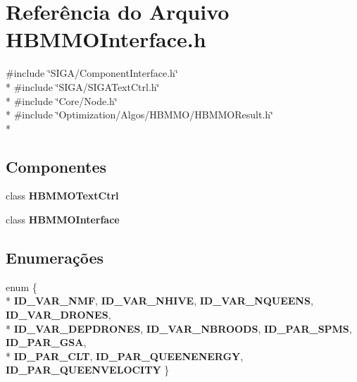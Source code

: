 \section{Referência do Arquivo H\+B\+M\+M\+O\+Interface.\+h}
\label{_h_b_m_m_o_interface_8h}
{\ttfamily \#include \char`\"{}S\+I\+G\+A/\+Component\+Interface.\+h\char`\"{}}\\*
{\ttfamily \#include \char`\"{}S\+I\+G\+A/\+S\+I\+G\+A\+Text\+Ctrl.\+h\char`\"{}}\\*
{\ttfamily \#include \char`\"{}Core/\+Node.\+h\char`\"{}}\\*
{\ttfamily \#include \char`\"{}Optimization/\+Algos/\+H\+B\+M\+M\+O/\+H\+B\+M\+M\+O\+Result.\+h\char`\"{}}\\*
\subsection*{Componentes}
\begin{DoxyCompactItemize}
\item 
class {\bf H\+B\+M\+M\+O\+Text\+Ctrl}
\item 
class {\bf H\+B\+M\+M\+O\+Interface}
\end{DoxyCompactItemize}
\subsection*{Enumerações}
\begin{DoxyCompactItemize}
\item 
enum \{ \\*
{\bf I\+D\+\_\+\+V\+A\+R\+\_\+\+N\+MF}, 
{\bf I\+D\+\_\+\+V\+A\+R\+\_\+\+N\+H\+I\+VE}, 
{\bf I\+D\+\_\+\+V\+A\+R\+\_\+\+N\+Q\+U\+E\+E\+NS}, 
{\bf I\+D\+\_\+\+V\+A\+R\+\_\+\+D\+R\+O\+N\+ES}, 
\\*
{\bf I\+D\+\_\+\+V\+A\+R\+\_\+\+D\+E\+P\+D\+R\+O\+N\+ES}, 
{\bf I\+D\+\_\+\+V\+A\+R\+\_\+\+N\+B\+R\+O\+O\+DS}, 
{\bf I\+D\+\_\+\+P\+A\+R\+\_\+\+S\+P\+MS}, 
{\bf I\+D\+\_\+\+P\+A\+R\+\_\+\+G\+SA}, 
\\*
{\bf I\+D\+\_\+\+P\+A\+R\+\_\+\+C\+LT}, 
{\bf I\+D\+\_\+\+P\+A\+R\+\_\+\+Q\+U\+E\+E\+N\+E\+N\+E\+R\+GY}, 
{\bf I\+D\+\_\+\+P\+A\+R\+\_\+\+Q\+U\+E\+E\+N\+V\+E\+L\+O\+C\+I\+TY}
 \}
\end{DoxyCompactItemize}
